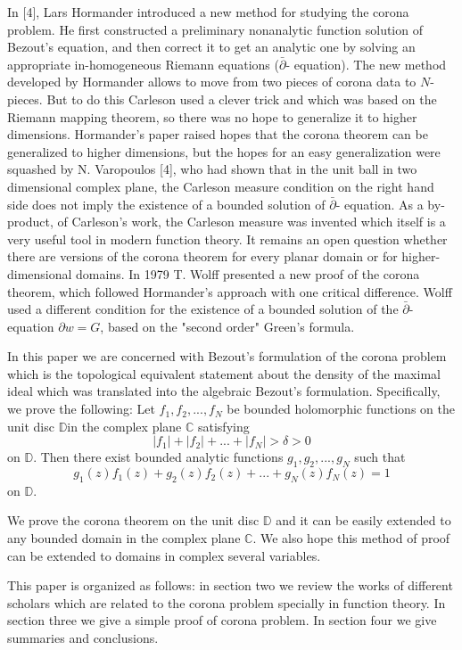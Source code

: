 \documentclass[reqno, 12pt]{amsart}
\theoremstyle{definition}
\theoremstyle{definition}
\begin{document}
In [4], Lars Hormander introduced a new method for studying the corona problem. He first constructed a preliminary nonanalytic function solution of Bezout's equation, and then correct it to get an analytic one by solving an appropriate in-homogeneous Riemann equations ($\bar{\partial}$- equation). The new method developed by Hormander allows to move from two pieces of corona data to $N$-pieces. But to do this Carleson used a clever trick and which was based on the Riemann mapping theorem, so there was no hope to generalize it to higher dimensions. Hormander's paper raised hopes that the corona theorem can be generalized to higher dimensions, but the hopes for an easy generalization were squashed by N. Varopoulos [4], who had shown that in the unit ball in two dimensional complex plane, the Carleson measure condition on the right hand side does not imply the existence of a bounded solution of $\bar{\partial}$- equation. As  a by-product, of Carleson's work, the Carleson measure was invented which itself is a very useful tool in modern function theory. It remains an open question whether there are versions of the corona theorem for every planar domain or for higher-dimensional domains. In 1979 T. Wolff presented a new proof of the corona theorem, which followed Hormander's approach with one critical difference. Wolff used a different condition for the existence of a bounded solution of the $\bar{\partial}$- equation $\partial w = G$, based on the "second order" Green's formula.

In this paper we are concerned with Bezout's formulation of the corona problem which is the topological equivalent statement about the density of the maximal ideal which was translated into the algebraic Bezout's formulation. Specifically, we prove the following: Let $f_1,  f_2, ...,f_N$ be bounded holomorphic functions on the unit disc $\mathbb{D}$in the complex plane $\mathbb {C}$ satisfying  $$\lvert f_1 \rvert+ \lvert f_2 \rvert+ ...+\lvert f_N\rvert > \delta > 0$$ on $\mathbb{D}$. Then there exist bounded analytic functions $g_1,  g_2, ..., g_N$ such that $$g_1(z)f_1(z)+g_2(z)f_2(z)+ ...+g_N(z)f_N(z)=1$$ on $\mathbb{D}$. 

We prove the corona theorem on the unit disc $\mathbb{D}$ and it can be easily extended to any bounded domain in the complex plane $\mathbb {C}.$ We also hope this method of proof can be extended to domains in complex several variables.

This paper is organized as follows: in section two we review the works of different scholars which are related to the corona problem specially in function theory. In section three we give a simple proof of corona problem. In section four we give summaries and conclusions.
\end{document}
